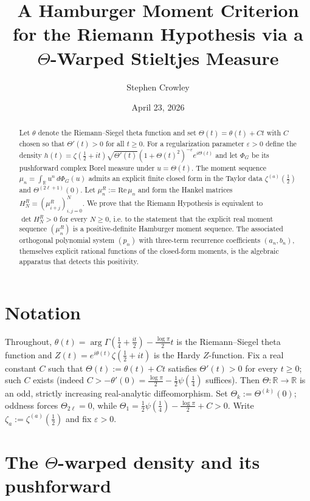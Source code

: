 \documentclass[11pt]{amsart}
\title{A Hamburger Moment Criterion for the Riemann Hypothesis via a
       $\Theta$-Warped Stieltjes Measure}
\author{Stephen Crowley}
\date{April 23, 2026}
\theoremstyle{definition}
\begin{document}
\maketitle

\begin{abstract}
Let $\theta$ denote the Riemann--Siegel theta function and set
$\Theta(t)=\theta(t)+Ct$ with $C$ chosen so that $\Theta'(t)>0$ for all
$t\ge 0$. For a regularization parameter $\varepsilon>0$ define the density
$h(t)=\zeta(\tfrac12+it)\sqrt{\Theta'(t)}(1+\Theta(t)^{2})^{-\varepsilon}e^{i\Theta(t)}$
and let $\Phi_{G}$ be its pushforward complex Borel measure under
$u=\Theta(t)$. The moment sequence
$\mu_{n}=\int_{\mathbb{R}}u^{n}\,d\Phi_{G}(u)$ admits an explicit finite
closed form in the Taylor data $\zeta^{(a)}(\tfrac12)$ and
$\Theta^{(2\ell+1)}(0)$. Let $\mu_{n}^{R}:=\mathrm{Re}\,\mu_{n}$ and form
the Hankel matrices $H_{N}^{R}=(\mu_{i+j}^{R})_{i,j=0}^{N}$. We prove that
the Riemann Hypothesis is equivalent to
$\det H_{N}^{R}>0$ for every $N\ge 0$, i.e. to the statement that the
explicit real moment sequence $(\mu_{n}^{R})$ is a positive-definite
Hamburger moment sequence. The associated orthogonal polynomial system
$(p_{n})$ with three-term recurrence coefficients $(a_{n},b_{n})$,
themselves explicit rational functions of the closed-form moments, is the
algebraic apparatus that detects this positivity.
\end{abstract}

\section{Notation}

Throughout, $\theta(t)=\arg\Gamma(\tfrac14+\tfrac{it}{2})-\tfrac{\log\pi}{2}t$
is the Riemann--Siegel theta function and $Z(t)=e^{i\theta(t)}\zeta(\tfrac12+it)$
is the Hardy $Z$-function. Fix a real constant $C$ such that
$\Theta(t):=\theta(t)+Ct$ satisfies $\Theta'(t)>0$ for every $t\ge 0$; such
$C$ exists (indeed $C>-\theta'(0)=\tfrac{\log\pi}{2}-\tfrac12\psi(\tfrac14)$
suffices). Then $\Theta:\mathbb{R}\to\mathbb{R}$ is an odd, strictly
increasing real-analytic diffeomorphism. Set $\Theta_{k}:=\Theta^{(k)}(0)$;
oddness forces $\Theta_{2\ell}=0$, while
$\Theta_{1}=\tfrac12\psi(\tfrac14)-\tfrac{\log\pi}{2}+C>0$.
Write $\zeta_{a}:=\zeta^{(a)}(\tfrac12)$ and fix $\varepsilon>0$.

\section{The $\Theta$-warped density and its pushforward}
\end{document}

